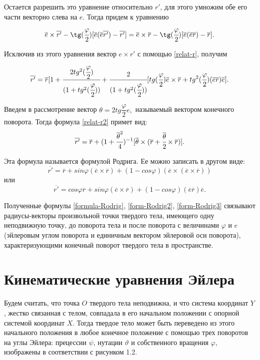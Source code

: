 \documentclass[14pt]{extreport}
\newcommand{\ov}{\overline}
\newcommand{\fr}{\cfrac}
\newcommand{\ti}{\times}
\newcommand{\ttt}{\theta}
\renewcommand{\phi}{\varphi} %
\begin{document}
Остается разрешить это уравнение относительно $r'$, для этого умно­жим обе его части векторно слева на $e$. Тогда придем к уравнению
\begin{equation}
\label{relat-r}
\ov{e}\ti\ov{r'} - \tg(\fr{\phi}{2})[\ov{e}(\ov{e}\ov{r'})-\ov{r'}] = \ov{e}\ti\ov{r} - \tg(\fr{\phi}{2})[\ov{e}(\ov{e}\ov{r})-\ov{r}].
\end{equation}

Исключив из этого уравнения вектор $e \times r'$ с помощью \eqref{relat-r}, получим
\begin{equation}
\label{relat-r2}
\ov{r'} = \ov{r}[1+\fr{2tg^{2}(\fr{\phi}{2})}{(1+tg^{2}(\fr{\phi}{2}))} + \fr{2}{(1+tg^{2}(\fr{\phi}{2}))}[tg(\fr{\phi}{2})\ov{e}\ti\ov{r} + tg^{2}(\fr{\phi}{2})(\ov{e}\ov{r})\ov{e}].
\end{equation}

Введем в рассмотрение вектор $\theta=2 tg \dfrac{\phi}{2}e,$ называемый вектором конечного поворота. Тогда формула \eqref{relat-r2} примет вид:
\begin{equation}
\label{formula-Rodrig}
\ov{r'} = \ov{r} + (1+ \fr{\ov{\theta}^{2}}{4})^{-1}[\ov{\ttt}\ti(\ov{r}+\fr{\ov{\ttt}}{2}\ti\ov{r})].
\end{equation}

Эта формула называется формулой Родрига. Ее можно записать в дру­гом виде:
\begin{equation}
\label{form-Rodrig2}
\ov{r'} = \ov{r} + sin\phi(\ov{e}\ti\ov{r}) + (1 - cos\phi)(\ov{e}\ti(\ov{e}\ti\ov{r}))
\end{equation}
или
\begin{equation}
\label{form-Rodrig3}
\ov{r'} = cos\phi\ov{r} + sin\phi(\ov{e}\ti\ov{r}) + (1 - cos\phi)(\ov{e}\ov{r})\ov{e}.
\end{equation}

Полученные формулы \eqref{formula-Rodrig}, \eqref{form-Rodrig2}, \eqref{form-Rodrig3} связывают радиусы-векторы произвольной точки твердого тела, имеющего одну неподвижную точку, до поворота тела и после поворота с величинами $\phi$ и $e$ (эйлеровым углом поворота и единичным вектором эйлеровой оси поворота), характери­зующими конечный поворот твердого тела в пространстве.

\section{Кинематические уравнения Эйлера}
Будем считать, что точка $O$ твердого тела неподвижна, и что систе­ма координат $Y$, жестко связанная с телом, совпадала в его начальном положении с опорной системой координат $X$. Тогда твердое тело может быть переведено из этого начального положения в любое конечное положение с помощью трех поворотов на углы Эйлера: прецессии $\psi$, нутации $\vartheta$ и собственного вращения $\phi$, изображены в соответствии с рисунком 1.2.
\end{document}
